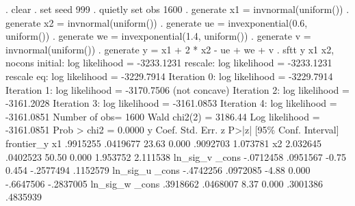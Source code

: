 . clear
{\smallskip}
. set seed 999
{\smallskip}
. quietly set obs 1600
{\smallskip}
. generate x1 = invnormal(uniform())
{\smallskip}
. generate x2 = invnormal(uniform())
{\smallskip}
. generate ue = invexponential(0.6, uniform())
{\smallskip}
. generate we = invexponential(1.4, uniform())
{\smallskip}
. generate v = invnormal(uniform())
{\smallskip}
. generate y = x1 + 2 * x2 - ue + we + v
{\smallskip}
. sftt y x1 x2, nocons
{\smallskip}
initial:       log likelihood = -3233.1231
rescale:       log likelihood = -3233.1231
rescale eq:    log likelihood = -3229.7914
Iteration 0:   log likelihood = -3229.7914  
Iteration 1:   log likelihood = -3170.7506  (not concave)
Iteration 2:   log likelihood = -3161.2028  
Iteration 3:   log likelihood = -3161.0853  
Iteration 4:   log likelihood = -3161.0851  
{\smallskip}
{}Number of obs=       1600
                                                  Wald chi2(2)    =    3186.44
Log likelihood = -3161.0851                       Prob > chi2     =     0.0000
{\smallskip}
           y {\VBAR}      Coef.   Std. Err.      z    P>|z|     [95\% Conf. Interval]
frontier_y   {\VBAR}
          x1 {\VBAR}   .9915255   .0419677    23.63   0.000     .9092703    1.073781
          x2 {\VBAR}   2.032645   .0402523    50.50   0.000     1.953752    2.111538
ln_sig_v     {\VBAR}
       _cons {\VBAR}  -.0712458   .0951567    -0.75   0.454    -.2577494    .1152579
ln_sig_u     {\VBAR}
       _cons {\VBAR}  -.4742256   .0972085    -4.88   0.000    -.6647506   -.2837005
ln_sig_w     {\VBAR}
       _cons {\VBAR}   .3918662   .0468007     8.37   0.000     .3001386    .4835939
